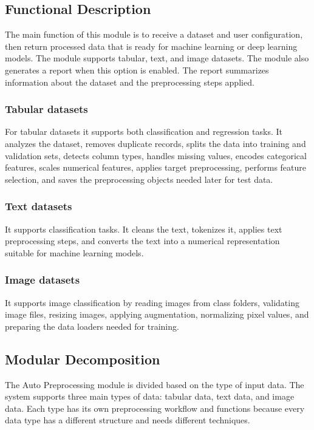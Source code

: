 \documentclass[12pt,a4paper]{report}
\begin{document}
\subsection{Functional Description}
\noindent The main function of this module is to receive a dataset and user configuration,
then return processed data that is ready for machine learning or deep learning
models. The module supports tabular, text, and image datasets.
\noindent The module also generates a report when this option is enabled. The report
summarizes information about the dataset and the preprocessing steps applied.

\subsubsection{Tabular datasets}
\noindent For tabular datasets it supports both classification and regression
tasks. It analyzes the dataset, removes duplicate records, splits the data into
training and validation sets, detects column types, handles missing values,
encodes categorical features, scales numerical features, applies target
preprocessing, performs feature selection, and saves the preprocessing objects
needed later for test data.
\subsubsection{Text datasets}
\noindent It supports classification tasks. It cleans the text,
tokenizes it, applies text preprocessing steps, and converts the text into a
numerical representation suitable for machine learning models.
\subsubsection{Image datasets}
\noindent It supports image classification by reading images from class
folders, validating image files, resizing images, applying augmentation, normalizing pixel values, and
preparing the data loaders needed for training.




\subsection{Modular Decomposition}
\noindent The Auto Preprocessing module is divided based on the type of input data. The
system supports three main types of data: tabular data, text data, and image data.
Each type has its own preprocessing workflow and functions because every data type has a different
structure and needs different techniques.
\end{document}
